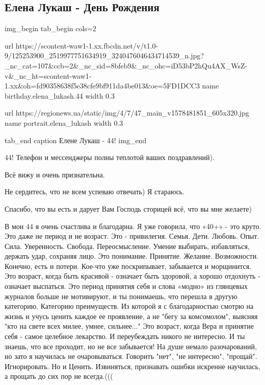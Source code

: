  
 
 

\subsection{Елена Лукаш - День Рождения}
\label{sec:12_11_2020.fb.elena_lukash.1.dr_44}

\ifcmt
img_begin 
  tab_begin cols=2

    url https://scontent-waw1-1.xx.fbcdn.net/v/t1.0-9/125253900_2519977751634919_3240476046434714539_n.jpg?_nc_cat=107&ccb=2&_nc_sid=8bfeb9&_nc_ohc=iD53bP2hQu4AX_WsZ-v&_nc_ht=scontent-waw1-1.xx&oh=fd90358638f5e38cfe9bf911da4be013&oe=5FD1DCC3
    name birthday.elena_lukash.44
    width 0.3

    url https://regionews.ua/static/img/4/7/47_main_v1578481851_605x320.jpg
    name portrait.elena_lukash
    width 0.3

  tab_end
  caption Елене Лукаш - 44!
img_end
\fi

44!
\obeycr
Телефон и мессенджеры полны теплотой ваших поздравлений). 

Всё вижу и очень признательна.

Не сердитесь, что не всем успеваю отвечать) Я стараюсь. 

Спасибо, что вы есть и дарует Вам Господь сторицей всё, что вы мне желаете)  

В мои 44 я очень счастлива и благодарна.
Я уже говорила, что «40+» - это круто. 
Это даже не период и не возраст. 
Это - привилегия. 
Семья. Дети. Любовь. Опыт. Сила. Уверенность. Свобода. 
Переосмысление. 
Умение выбирать, избавляться, держать удар, сохраняя лицо. 
Это понимание.
Принятие. 
Желание. 
Возможности.   
Конечно, есть и потери. 
Кое-что уже поскрипывает, забывается и морщинится.
Это возраст, когда быть красивой - означает быть здоровой, а хорошо отдохнуть -  означает выспаться. 
Это период принятия себя и слова «модно» из глянцевых журналов больше не мотивируют, и ты понимаешь, что перешла в другую категорию. 
Категорию преимуществ. 
Из которой я с благодарностью  смотрю на жизнь и учусь ценить каждое ее проявление, а не "бегу за комсомолом", выясняя "кто на свете всех милее, умнее, сильнее..." 
Это возраст, когда Вера и принятие себя - самое целебное лекарство. 
И переубеждать никого не интересно. 
И ты знаешь, что все проходит, но не все забывается! 
На душе немало разочарований, но зато я научилась не очаровываться. 
Говорить "нет", "не интересно", "прощай". Игнорировать. Но и Ценить. 
Извиняться, признавать ошибки искренне научилась, а прощать до сих пор не всегда.((( 

